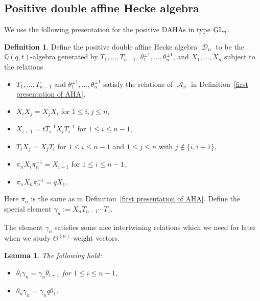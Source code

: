 \documentclass[10pt,a4paper]{amsart}
\numberwithin{equation}{section}
\newtheorem{Lemma}[Theorem]{Lemma}
\theoremstyle{definition}
\newtheorem{Definition}[Theorem]{Definition}
\DeclareMathOperator{\sA}{\mathscr{A}}
\DeclareMathOperator{\sD}{\mathscr{D}}
\begin{document}
\subsection{Positive double affine Hecke algebra}
We use the following presentation for the positive DAHAs in type ${\rm GL}_n$.
\begin{Definition}\label{daha def}
 Define the positive double affine Hecke algebra $\sD_n$ to be the $\mathbb{Q}(q,t)$-algebra generated by $T_1,\dots,T_{n-1}$, $\theta_1^{\pm 1},\dots, \theta_n^{\pm 1}$, and $X_1,\dots, X_n$ subject to the relations
 \begin{itemize}
\itemsep=0pt
 \item $T_1,\dots,T_{n-1}$ and $\theta_1^{\pm 1},\dots, \theta_n^{\pm 1}$ satisfy the relations of $\sA_n$ in Definition~\ref{first presentation of AHA},
 \item $X_iX_j = X_jX_i$ for $1\leq i,j \leq n$,
 \item $X_{i+1} = tT_i^{-1}X_iT_i^{-1}$ for $1\leq i \leq n-1$,
 \item $T_iX_j = X_jT_i$ for $1\leq i\leq n-1$ and $1\leq j \leq n$ with $j \notin \{i,i+1\}$,
 \item $\pi_nX_i\pi_n^{-1} = X_{i+1}$ for $1\leq i \leq n-1$,
 \item $\pi_nX_n\pi_n^{-1} = qX_1$.
 \end{itemize}
 Here $\pi_n$ is the same as in Definition~\ref{first presentation of AHA}. Define the special element $\gamma_n:= X_nT_{n-1}\cdots T_1$.
\end{Definition}

The element $\gamma_n$ satisfies some nice intertwining relations which we need for later when we study $\Theta^{(n)}$-weight vectors.

\begin{Lemma}\label{intertwiner Lemma}
 The following hold:
 \begin{itemize}
\itemsep=0pt
 \item $\theta_i\gamma_n = \gamma_n \theta_{i+1}$ for $1\leq i \leq n-1$,
 \item $\theta_n \gamma_n = \gamma_n q\theta_1$.
 \end{itemize}
\end{Lemma}
\end{document}
